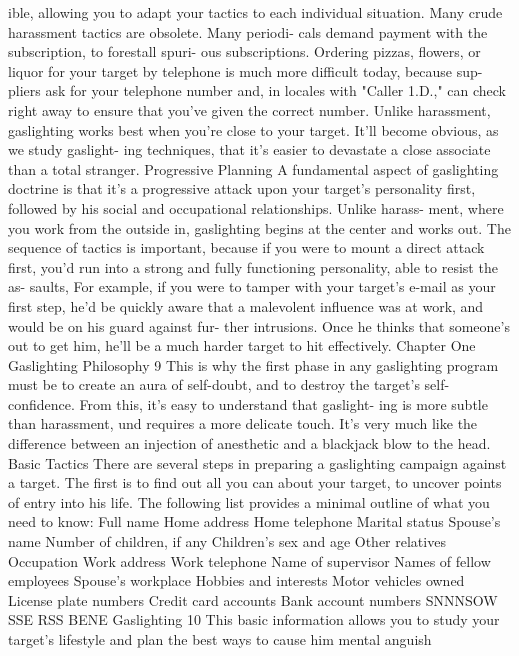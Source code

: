 \documentclass{book}
\begin{document}
ible, allowing you to adapt your tactics to each individual 
situation. 
Many crude harassment tactics are obsolete. Many periodi- 
cals demand payment with the subscription, to forestall spuri- 
ous subscriptions. Ordering pizzas, flowers, or liquor for your 
target by telephone is much more difficult today, because sup- 
pliers ask for your telephone number and, in locales with 
"Caller 1.D.," can check right away to ensure that you've given 
the correct number. 
Unlike harassment, gaslighting works best when you're 
close to your target. It'll become obvious, as we study gaslight- 
ing techniques, that it's easier to devastate a close associate than 
a total stranger. 
Progressive Planning 
A fundamental aspect of gaslighting doctrine is that it's a progressive attack upon your target's personality first, followed by his social and occupational relationships. Unlike harass- ment, where you work from the outside in, gaslighting begins at the center and works out. The sequence of tactics is important, because if you were to mount a direct attack first, you'd run into a strong and fully functioning personality, able to resist the as- saults, 
For example, if you were to tamper with your target's e-mail as your first step, he'd be quickly aware that a malevolent influence was at work, and would be on his guard against fur- ther intrusions. Once he thinks that someone's out to get him, he'll be a much harder target to hit effectively. 
Chapter One 
Gaslighting Philosophy 
9 
This is why the first phase in any gaslighting program must 
be to create an aura of self-doubt, and to destroy the target's 
self-confidence. From this, it's easy to understand that gaslight- 
ing is more subtle than harassment, und requires a more delicate 
touch. It's very much like the difference between an injection of 
anesthetic and a blackjack blow to the head. 
Basic Tactics 
There are several steps in preparing a gaslighting campaign 
against a target. The first is to find out all you can about your 
target, to uncover points of entry into his life. The following list 
provides a minimal outline of what you need to know: 
Full name 
Home address 
Home telephone 
Marital status 
Spouse's name 
Number of children, if any 
Children’s sex and age 
Other relatives 
Occupation 
Work address 
Work telephone 
Name of supervisor 
Names of fellow employees 
Spouse's workplace 
Hobbies and interests 
Motor vehicles owned 
License plate numbers 
Credit card accounts 
Bank account numbers SNNNSOW 
SSE 
RSS 
BENE  Gaslighting 
10 
This basic information allows you to study your target's 
lifestyle and plan the best ways to cause him mental anguish 
\end{document}
